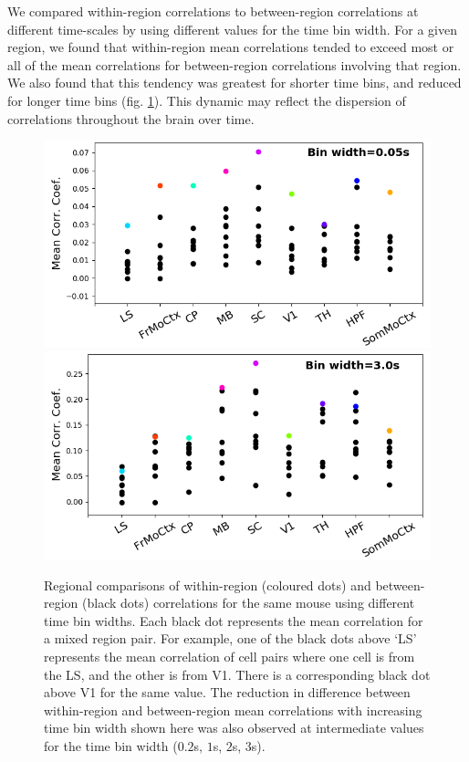 \documentclass[a4paper,12pt]{article}
\theoremstyle{definition}
\begin{document}
We compared within-region correlations to between-region correlations at different time-scales by using different values for the time bin width. For a given region, we found that within-region mean correlations tended to exceed most or all of the mean correlations for between-region correlations involving that region. We also found that this tendency was greatest for shorter time bins, and reduced for longer time bins (fig. \ref{fig:within_between}). This dynamic may reflect the dispersion of correlations throughout the brain over time.

\begin{figure}[t!]
    \centering
    \includegraphics[width=0.45\columnwidth]{images/Krebs_0p05_corr_comp.png}
    \includegraphics[width=0.45\columnwidth]{images/Krebs_3p0_corr_comp.png}
    \vspace{-0.4cm}
    \caption{Regional comparisons of within-region (coloured dots) and between-region (black dots) correlations for the same mouse using different time bin widths. Each black dot represents the mean correlation for a mixed region pair. For example, one of the black dots above `LS' represents the mean correlation of cell pairs where one cell is from the LS, and the other is from V1. There is a corresponding black dot above V1 for the same value. The reduction in difference between within-region and between-region mean correlations with increasing time bin width shown here was also observed at intermediate values for the time bin width ($0.2$s, $1$s, $2$s, $3$s).}
    \vspace{-0.4cm}
    \label{fig:within_between}
\end{figure}
\end{document}
